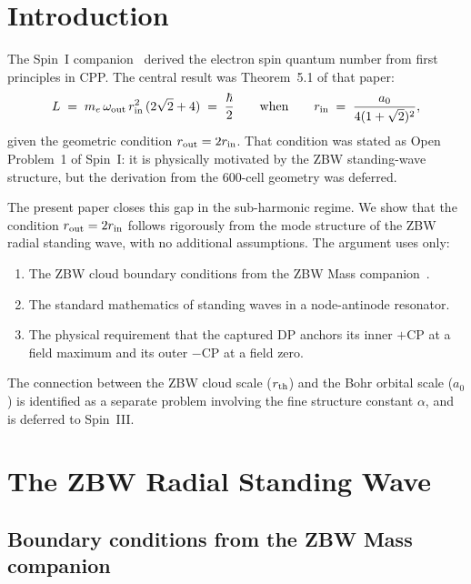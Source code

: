 \documentclass[12pt]{article}
\newcommand{\rth}{r_{\rm th}}
\newcommand{\rin}{r_{\rm in}}
\newcommand{\rout}{r_{\rm out}}
\newcommand{\oout}{\omega_{\rm out}}
\newcommand{\aBohr}{a_0}
\begin{document}
\section{Introduction}
\label{sec:intro}

The Spin~I companion~\cite{sI} derived the electron spin quantum number
from first principles in CPP.  The central result was
Theorem~5.1 of that paper:
\begin{equation}
  L \;=\; m_e\,\oout\,\rin^2\,(2\sqrt{2}+4) \;=\; \frac{\hbar}{2}
  \qquad\text{when}\qquad
  \rin \;=\; \frac{\aBohr}{4(1+\sqrt{2})^2},
  \label{eq:spinI_result}
\end{equation}
given the geometric condition $\rout = 2\rin$.  That condition was
stated as Open Problem~1 of Spin~I: it is physically motivated by
the ZBW standing-wave structure, but the derivation from the 600-cell
geometry was deferred.

The present paper closes this gap in the sub-harmonic regime.  We
show that the condition $\rout = 2\rin$ follows rigorously from the
mode structure of the ZBW radial standing wave, with no additional
assumptions.  The argument uses only:
\begin{enumerate}[noitemsep]
  \item The ZBW cloud boundary conditions from the ZBW Mass
    companion~\cite{c4}.
  \item The standard mathematics of standing waves in a
    node-antinode resonator.
  \item The physical requirement that the captured DP anchors
    its inner $+$CP at a field maximum and its outer $-$CP at
    a field zero.
\end{enumerate}

The connection between the ZBW cloud scale ($\rth$) and the Bohr
orbital scale ($\aBohr$) is identified as a separate problem involving
the fine structure constant $\alpha$, and is deferred to Spin~III.

\section{The ZBW Radial Standing Wave}
\label{sec:ZBW_wave}

\subsection{Boundary conditions from the ZBW Mass companion}
\end{document}
